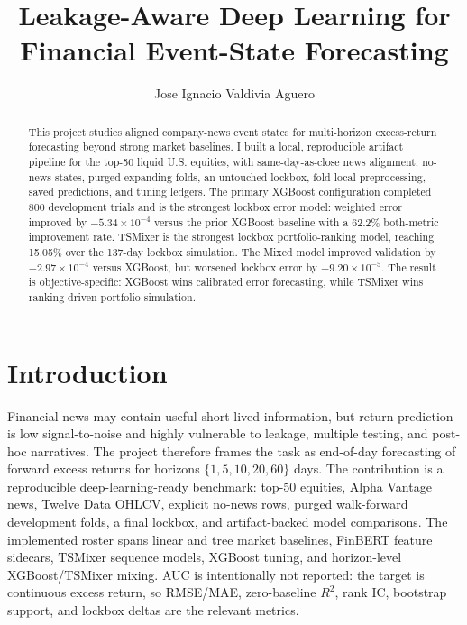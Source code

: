\documentclass[sigconf,nonacm]{acmart}
\begin{document}
\title[Leakage-Aware Event-State Forecasting]{Leakage-Aware Deep Learning for Financial Event-State Forecasting}

\author{Jose Ignacio Valdivia Aguero}

\begin{abstract}
This project studies aligned company-news event states for multi-horizon excess-return forecasting beyond strong market baselines. I built a local, reproducible artifact pipeline for the top-50 liquid U.S. equities, with same-day-as-close news alignment, no-news states, purged expanding folds, an untouched lockbox, fold-local preprocessing, saved predictions, and tuning ledgers. The primary XGBoost configuration completed 800 development trials and is the strongest lockbox error model: weighted error improved by $-5.34\times10^{-4}$ versus the prior XGBoost baseline with a 62.2\% both-metric improvement rate. TSMixer is the strongest lockbox portfolio-ranking model, reaching 15.05\% over the 137-day lockbox simulation. The Mixed model improved validation by $-2.97\times10^{-4}$ versus XGBoost, but worsened lockbox error by $+9.20\times10^{-5}$. The result is objective-specific: XGBoost wins calibrated error forecasting, while TSMixer wins ranking-driven portfolio simulation.
\end{abstract}

\maketitle

\section{Introduction}
Financial news may contain useful short-lived information, but return prediction is low signal-to-noise and highly vulnerable to leakage, multiple testing, and post-hoc narratives. The project therefore frames the task as end-of-day forecasting of forward excess returns for horizons $\{1,5,10,20,60\}$ days. The contribution is a reproducible deep-learning-ready benchmark: top-50 equities, Alpha Vantage news, Twelve Data OHLCV, explicit no-news rows, purged walk-forward development folds, a final lockbox, and artifact-backed model comparisons. The implemented roster spans linear and tree market baselines, FinBERT feature sidecars, TSMixer sequence models, XGBoost tuning, and horizon-level XGBoost/TSMixer mixing. AUC is intentionally not reported: the target is continuous excess return, so RMSE/MAE, zero-baseline $R^2$, rank IC, bootstrap support, and lockbox deltas are the relevant metrics.
\end{document}
